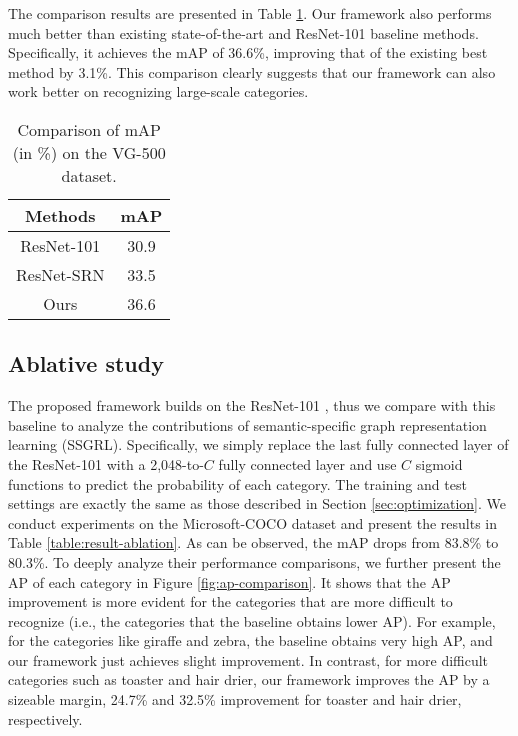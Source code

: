\documentclass[10pt,twocolumn,letterpaper]{article}
\begin{document}
The comparison results are presented in Table \ref{table:result-vg}. Our framework also performs much better than existing state-of-the-art and ResNet-101 baseline methods. Specifically, it achieves the mAP of 36.6\%, improving that of the existing best method by 3.1\%. This comparison clearly suggests that our framework can also work better on recognizing large-scale categories.

\begin{table}[!t]
\centering
\begin{tabular}{c|c}
\hline
\centering  Methods & mAP  \\
\hline
\hline
ResNet-101 \cite{he2016deep} & 30.9\\
ResNet-SRN \cite{zhu2017learning} & 33.5\\
\hline
Ours & 36.6  \\
\hline
\end{tabular}
\vspace{2pt}
\caption{Comparison of mAP (in \%) on the VG-500 dataset.}
\label{table:result-vg}
\end{table}


\subsection{Ablative study}
The proposed framework builds on the ResNet-101 \cite{he2016deep}, thus we compare with this baseline to analyze the contributions of semantic-specific graph representation learning (SSGRL). Specifically, we simply replace the last fully connected layer of the ResNet-101 with a 2,048-to-$C$ fully connected layer and use $C$ sigmoid functions to predict the probability of each category. The training and test settings are exactly the same as those described in Section \ref{sec:optimization}. We conduct experiments on the Microsoft-COCO dataset and present the results in Table \ref{table:result-ablation}. As can be observed, the mAP drops from 83.8\% to 80.3\%. To deeply analyze their performance comparisons, we further present the AP of each category in Figure \ref{fig:ap-comparison}. It shows that the AP improvement is more evident for the categories that are more difficult to recognize (i.e., the categories that the baseline obtains lower AP). For example, for the categories like giraffe and zebra, the baseline obtains very high AP, and our framework just achieves slight improvement. In contrast, for more difficult categories such as toaster and hair drier, our framework improves the AP by a sizeable margin, 24.7\% and 32.5\% improvement for toaster and hair drier, respectively.
\end{document}
